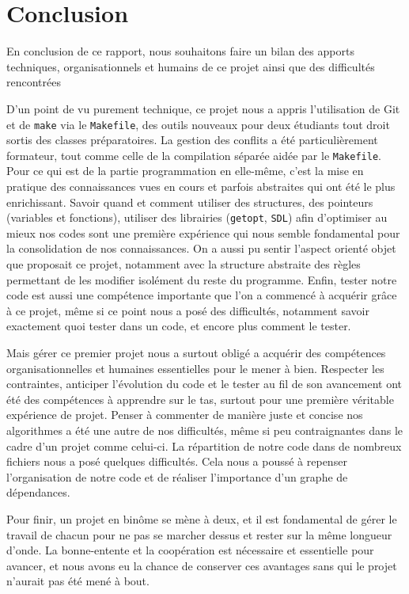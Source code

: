 \chapter{Conclusion}

En conclusion de ce rapport, nous souhaitons faire un bilan des apports techniques, organisationnels et humains de ce projet ainsi que des difficultés rencontrées

D'un point de vu purement technique, ce projet nous a appris l'utilisation de Git et de \texttt{make} via le \texttt{Makefile}, des outils nouveaux pour deux étudiants tout droit sortis des classes préparatoires. La gestion des conflits a été particulièrement formateur, tout comme celle de la compilation séparée aidée par le \texttt{Makefile}. Pour ce qui est de la partie programmation en elle-même, c'est la mise en pratique des connaissances vues en cours et parfois abstraites qui ont été le plus enrichissant. Savoir quand et comment utiliser des structures, des pointeurs (variables et fonctions), utiliser des librairies (\texttt{getopt}, \texttt{SDL}) afin d'optimiser au mieux nos codes sont une première expérience qui nous semble fondamental pour la consolidation de nos connaissances. On a aussi pu sentir l'aspect \og orienté objet\fg{} que proposait ce projet, notamment avec la structure abstraite des règles permettant de les modifier isolément du reste du programme. Enfin, tester notre code est aussi une compétence importante que l'on a commencé à acquérir grâce à ce projet, même si ce point nous a posé des difficultés, notamment savoir exactement quoi tester dans un code, et encore plus comment le tester. 

Mais gérer ce premier projet nous a surtout obligé a acquérir des compétences organisationnelles et humaines essentielles pour le mener à bien. Respecter les contraintes, anticiper l'évolution du code et le tester au fil de son avancement ont été des compétences à apprendre sur le tas, surtout pour une première véritable expérience de projet. Penser à commenter de manière juste et concise nos algorithmes a été une autre de nos difficultés, même si peu contraignantes dans le cadre d'un projet comme celui-ci. La répartition de notre code dans de nombreux fichiers nous a posé quelques difficultés. Cela nous a poussé à repenser l'organisation de notre code et de réaliser l'importance d'un graphe de dépendances.

Pour finir, un projet en binôme se mène à deux, et il est fondamental de gérer le travail de chacun pour ne pas se marcher dessus et rester sur la même longueur d'onde. La bonne-entente et la coopération est nécessaire et essentielle pour avancer, et nous avons eu la chance de conserver ces avantages sans qui le projet n'aurait pas été mené à bout.